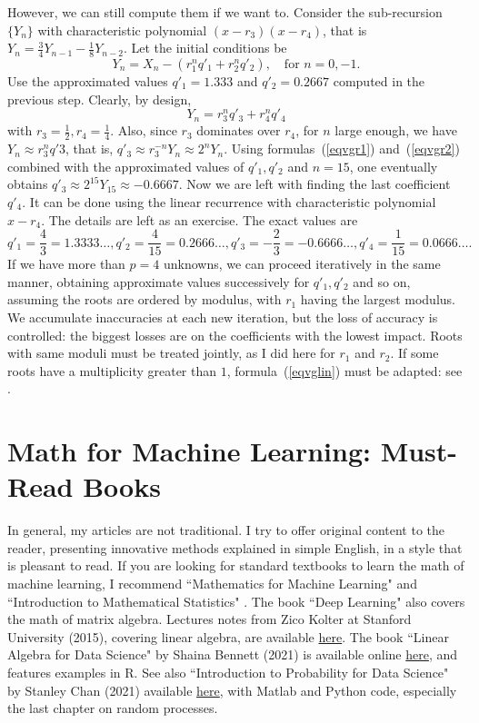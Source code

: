 \documentclass[oneside,10pt]{book}
\begin{document}
However, we can still compute them if we want to. Consider the sub-recursion $\{Y_n\}$ with characteristic polynomial $(x-r_3)(x-r_4)$, that is $Y_n=\frac{3}{4}Y_{n-1}-\frac{1}{8}Y_{n-2}$. Let the initial conditions be 
\begin{equation}\label{eqvgr1}
Y_n=X_n - (r_1^n q'_1 + r_2^n q'_2), \quad \text{for } n=0,-1.
\end{equation}
 Use the approximated values $q'_1=1.333$ and $q'_2=0.2667$ computed in the previous step. Clearly, by design,
\begin{equation}\label{eqvgr2}
Y_n=r_3^n q'_3 + r_4^n q'_4
\end{equation}
with $r_3=\frac{1}{2},r_4=\frac{1}{4}$. Also, since $r_3$ dominates over $r_4$, for $n$ large enough, we have $Y_n\approx r_3^n q'3$, that is,
$q'_3\approx r_3^{-n}Y_n \approx 2^n Y_n$. Using formulas~(\ref{eqvgr1}) and~(\ref{eqvgr2}) combined with the approximated values of $q'_1, q'_2$
 and $n=15$, one
eventually obtains $q'_3\approx 2^{15}Y_{15} \approx -0.6667$. Now we are left with finding the last coefficient $q'_4$. It can be done using the linear recurrence with characteristic polynomial $x-r_4$. The details are left as an exercise. The exact values are
$$q'_1=\frac{4}{3}=1.3333\dots, q'_2=\frac{4}{15}=0.2666\dots, q'_3=-\frac{2}{3}=-0.6666\dots, q'_4=\frac{1}{15}=0.0666\dots. $$
If we have more than $p=4$ unknowns, we can proceed iteratively in the same manner, obtaining approximate values successively for $q'_1,q'_2$ and so on, assuming the roots are ordered by modulus, with $r_1$ having the largest modulus.  We accumulate inaccuracies at each new iteration, but the loss of accuracy is controlled:
 the biggest losses are on the coefficients with the lowest impact. Roots with same moduli must be treated jointly, as I did here for $r_1$ and $r_2$. If some roots have a multiplicity greater than $1$, formula~(\ref{eqvglin}) must be adapted: see \cite{arashfa}.

\section{Math for Machine Learning: Must-Read Books}

In general, my articles are not traditional. I try to offer original content to the reader, presenting innovative methods explained in simple English, in
a style that is pleasant to read. 
If you are looking for standard textbooks to learn the math of machine learning, I recommend ``Mathematics for Machine Learning" \cite{faisal2020}
and ``Introduction to Mathematical Statistics" \cite{hogg2019}. The book ``Deep Learning" \cite{goodfellow2016} also covers the math of matrix algebra. Lectures notes from Zico Kolter at Stanford University (2015), covering linear algebra, are available \href{https://cs229.stanford.edu/section/cs229-linalg.pdf}{here}. The book ``Linear Algebra for Data Science" by Shaina Bennett (2021) is available online \href{https://shainarace.github.io/LinearAlgebra/}{here},
and features examples in R. See also ``Introduction to Probability for Data Science" by Stanley Chan (2021) available \href{https://probability4datascience.com/}{here}, with Matlab and Python code, especially the last chapter on random processes.
\end{document}
